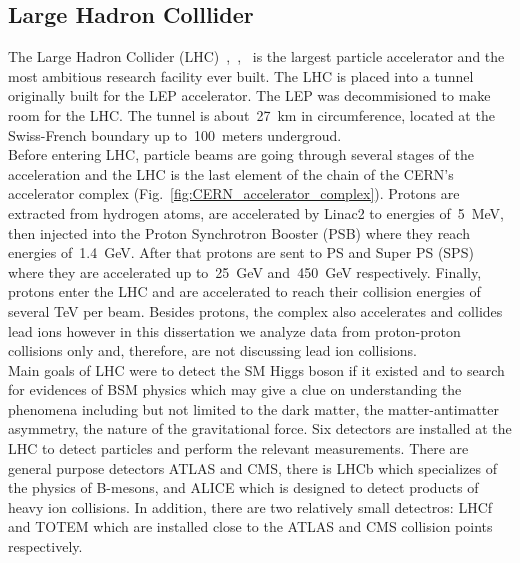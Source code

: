 \subsection{Large Hadron Colllider}
\label{sec:Exp_LHC}
The Large Hadron Collider (LHC)~\cite{ref_LHC_brochure},~\cite{ref_LHC_TDR},~\cite{ref_LHC_website} is the largest particle accelerator and the most ambitious research facility ever built. The LHC is placed into a tunnel originally built for the LEP accelerator. The LEP was decommisioned to make room for the LHC. The tunnel is about~27~km in circumference, located at the Swiss-French boundary up to~100~meters undergroud.\\

Before entering LHC, particle beams are going through several stages of the acceleration and the LHC is the last element of the chain of the CERN's accelerator complex (Fig.~\ref{fig:CERN_accelerator_complex}). Protons are extracted from hydrogen atoms, are accelerated by Linac2 to energies of~5~MeV, then injected into the Proton Synchrotron Booster (PSB) where they reach energies of~1.4~GeV. After that protons are sent to PS and Super PS (SPS) where they are accelerated up to~25~GeV and~450~GeV respectively. Finally, protons enter the LHC and are accelerated to reach their collision energies of several TeV per beam. Besides protons, the complex also accelerates and collides lead ions however in this dissertation we analyze data from proton-proton collisions only and, therefore, are not discussing lead ion collisions.\\    



Main goals of LHC were to detect the SM Higgs boson if it existed and to search for evidences of BSM physics which may give a clue on understanding the phenomena including but not limited to the dark matter, the matter-antimatter asymmetry, the nature of the gravitational force. Six detectors are installed at the LHC to detect particles and perform the relevant measurements. There are general purpose detectors ATLAS and CMS, there is LHCb which specializes of the physics of B-mesons, and ALICE which is designed to detect products of heavy ion collisions. In addition, there are two relatively small detectros: LHCf and TOTEM which are installed close to the ATLAS and CMS collision points respectively. \\


